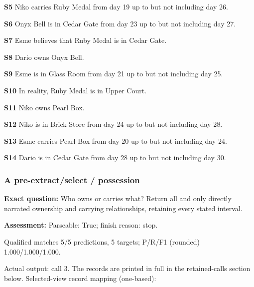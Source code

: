 \noindent\textbf{S5} Niko carries Ruby Medal from day 19 up to but not including day 26.\par\smallskip

\noindent\textbf{S6} Onyx Bell is in Cedar Gate from day 23 up to but not including day 27.\par\smallskip

\noindent\textbf{S7} Esme believes that Ruby Medal is in Cedar Gate.\par\smallskip

\noindent\textbf{S8} Dario owns Onyx Bell.\par\smallskip

\noindent\textbf{S9} Esme is in Glass Room from day 21 up to but not including day 25.\par\smallskip

\noindent\textbf{S10} In reality, Ruby Medal is in Upper Court.\par\smallskip

\noindent\textbf{S11} Niko owns Pearl Box.\par\smallskip

\noindent\textbf{S12} Niko is in Brick Store from day 24 up to but not including day 28.\par\smallskip

\noindent\textbf{S13} Esme carries Pearl Box from day 20 up to but not including day 24.\par\smallskip

\noindent\textbf{S14} Dario is in Cedar Gate from day 28 up to but not including day 30.\par\smallskip

\subsubsection*{A pre-extract/select / possession}

\noindent\textbf{Exact question:} Who owns or carries what? Return all and only directly narrated ownership and carrying relationships, retaining every stated interval.\par

\noindent\textbf{Assessment:} Parseable: True; finish reason: stop.

Qualified matches 5/5 predictions, 5 targets; P/R/F1 (rounded) 1.000/1.000/1.000.\par

Actual output: call 3. The records are printed in full in the retained-calls section below. Selected-view record mapping (one-based):

